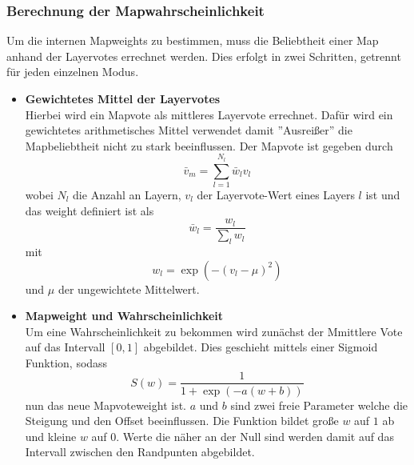         \subsubsection{Berechnung der Mapwahrscheinlichkeit}
            Um die internen Mapweights zu bestimmen, muss die Beliebtheit einer Map anhand der Layervotes errechnet werden. 
            Dies erfolgt in zwei Schritten, getrennt für jeden einzelnen Modus. 
            \begin{itemize}
                \item \textbf{Gewichtetes Mittel der Layervotes}\\
                Hierbei wird ein Mapvote als mittleres Layervote errechnet. 
                Dafür wird ein gewichtetes arithmetisches Mittel verwendet damit ''Ausreißer'' die Mapbeliebtheit nicht zu stark beeinflussen. 
                Der Mapvote ist gegeben durch 
                \begin{equation}
                    \bar{v}_m = \sum_{l=1}^{N_l} \bar{w}_l v_l
                \end{equation}
                wobei $N_l$ die Anzahl an Layern, $v_l$ der Layervote-Wert eines Layers $l$ ist und das weight definiert ist als 
                \begin{equation}
                    \bar{w}_l = \frac{w_l}{\sum_l w_l}
                \end{equation}
                mit 
                \begin{equation}
                    w_l = \exp\left(-\left(v_l-\mu\right)^2\right)
                \end{equation}
                und $\mu$ der ungewichtete Mittelwert. 
                \item \textbf{Mapweight und Wahrscheinlichkeit}\\
                Um eine Wahrscheinlichkeit zu bekommen wird zunächst der Mmittlere Vote auf das Intervall $[0,1]$ abgebildet.
                Dies geschieht mittels einer Sigmoid Funktion, sodass 
                \begin{equation}
                    S(w) = \frac{1}{1+\exp\left(-a(w+b)\right)}
                \end{equation}
                nun das neue Mapvoteweight ist. $a$ und $b$ sind zwei freie Parameter welche die Steigung und den Offset beeinflussen. 
                Die Funktion bildet große $w$ auf $1$ ab und kleine $w$ auf $0$. 
                Werte die näher an der Null sind werden damit auf das Intervall zwischen den Randpunten abgebildet.

\end{itemize}
